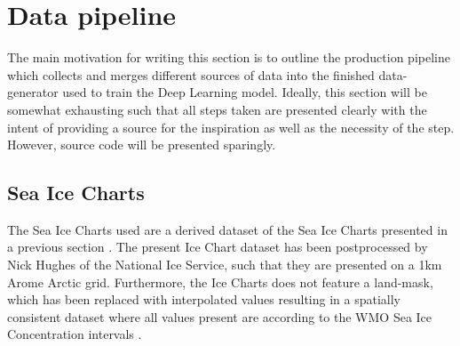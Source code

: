 \documentclass[../main/thesis.tex]{subfiles}
\begin{document}
\section{Data pipeline}
The main motivation for writing this section is to outline the production pipeline which collects and merges different sources of data into the finished data-generator used to train the Deep Learning model. Ideally, this section will be somewhat exhausting such that all steps taken are presented clearly with the intent of providing a source for the inspiration as well as the necessity of the step. However, source code will be presented sparingly.

\subsection*{Sea Ice Charts}
The Sea Ice Charts used are a derived dataset of the Sea Ice Charts presented in a previous section . The present Ice Chart dataset has been postprocessed by Nick Hughes of the National Ice Service, such that they are presented on a 1km Arome Arctic grid. Furthermore, the Ice Charts does not feature a land-mask, which has been replaced with interpolated values resulting in a spatially consistent dataset where all values present are according to the WMO Sea Ice Concentration intervals \cite{JETSI2014}. 

\biblio
\end{document}
